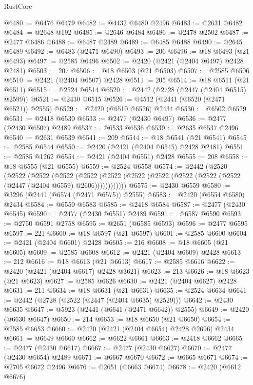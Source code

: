 \begin{lexlean}{RustCore}
\begin{coremodule}
@6480 := @6476 @6479
@6482 := @4432 @6480 @2496
@6483 := @2631 @6482
@6484 := @2648 @192
@6485 := @2646 @6484
@6486 := @2478 @2502
@6487 := @2477 @6486
@6488 := @6487 @2489
@6489 := @6485 @6488
@6490 := @2645 @6489
@6492 := @6483 (@2471 @6490)
@6493 := 206
@6496 := @18 @6493 (@21 @6493)
@6497 := @2585 @6496
@6502 := @2420 (@2421 (@2404 @6497) @2428 @2481)
@6503 := 207
@6506 := @18 @6503 (@21 @6503)
@6507 := @2585 @6506
@6510 := @2421 (@2404 @6507) @2428
@6511 := 205
@6514 := @18 @6511 (@21 @6511)
@6515 := @2524 @6514
@6520 := @2442 (@2728 (@2447 (@2404 @6515) @2599))
@6521 := @2430 @6515
@6526 := @4512 (@2441 (@6520 (@2471 @6521)) @2555)
@6529 := @2420 (@6510 @6526) @2434
@6530 := @6502 @6529
@6531 := @2418 @6530
@6533 := @2477 (@2430 @6497)
@6536 := @2477 (@2430 @6507) @2489
@6537 := @6533 @6536
@6539 := @2635 @6537 @2496
@6540 := @2631 @6539
@6541 := 209
@6544 := @18 @6541 (@21 @6541)
@6545 := @2585 @6544
@6550 := @2420 (@2421 (@2404 @6545) @2428 @2481)
@6551 := @2585 @1262
@6554 := @2421 (@2404 @6551) @2428
@6555 := 208
@6558 := @18 @6555 (@21 @6555)
@6559 := @2524 @6558
@6574 := @2442
    (@2520
      (@2522
        (@2522
          (@2522
            (@2522 (@2522 (@2522 (@2522 (@2522 (@2522 (@2522 (@2447 (@2404 @6559) @2606))))))))))))
@6575 := @2430 @6559
@6580 := @3296 (@2441 (@6574 (@2471 @6575)) @2555)
@6583 := @2420 (@6554 @6580) @2434
@6584 := @6550 @6583
@6585 := @2418 @6584
@6587 := @2477 (@2430 @6545)
@6590 := @2477 (@2430 @6551) @2489
@6591 := @6587 @6590
@6593 := @2750 @6591 @2758
@6595 := @2651 (@6585 @6593)
@6596 := @2477 @6595
@6597 := 221
@6600 := @18 @6597 (@21 @6597)
@6601 := @2585 @6600
@6604 := @2421 (@2404 @6601) @2428
@6605 := 216
@6608 := @18 @6605 (@21 @6605)
@6609 := @2585 @6608
@6612 := @2421 (@2404 @6609) @2428
@6613 := 212
@6616 := @18 @6613 (@21 @6613)
@6617 := @2585 @6616
@6622 := @2420 (@2421 (@2404 @6617) @2428 @3621)
@6623 := 213
@6626 := @18 @6623 (@21 @6623)
@6627 := @2585 @6626
@6630 := @2421 (@2404 @6627) @2428
@6631 := 211
@6634 := @18 @6631 (@21 @6631)
@6635 := @2524 @6634
@6641 := @2442 (@2728 (@2522 (@2447 (@2404 @6635) @2529)))
@6642 := @2430 @6635
@6647 := @5923 (@2441 (@6641 (@2471 @6642)) @2555)
@6649 := @2420 (@6630 @6647)
@6650 := 214
@6653 := @18 @6650 (@21 @6650)
@6654 := @2585 @6653
@6660 := @2420 (@2421 (@2404 @6654) @2428 @2696) @2434
@6661 := @6649 @6660
@6662 := @6622 @6661
@6663 := @2418 @6662
@6665 := @2477 (@2430 @6617)
@6667 := @2477 (@2430 @6627)
@6670 := @2477 (@2430 @6654) @2489
@6671 := @6667 @6670
@6672 := @6665 @6671
@6674 := @2705 @6672 @2496
@6676 := @2651 (@6663 @6674)
@6678 := @2420 (@6612 @6676)

\end{coremodule}
\end{lexlean}
